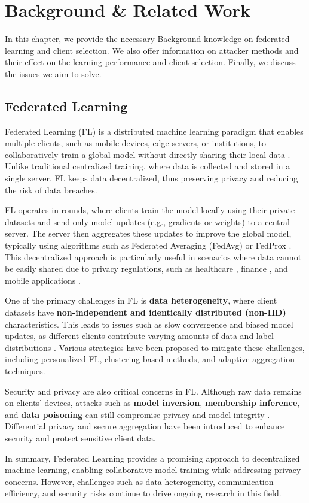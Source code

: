 \chapter{Background \& Related Work}
In this chapter, we provide the necessary Background knowledge on federated learning and client selection. We also offer information on attacker methods and their effect on the learning performance and client selection. Finally, we discuss the issues we aim to solve.

\section{Federated Learning}
Federated Learning (FL) is a distributed machine learning paradigm that enables multiple clients, such as mobile devices, edge servers, or institutions, to collaboratively train a global model without directly sharing their local data \cite{mcmahan2017communication}. Unlike traditional centralized training, where data is collected and stored in a single server, FL keeps data decentralized, thus preserving privacy and reducing the risk of data breaches.

FL operates in rounds, where clients train the model locally using their private datasets and send only model updates (e.g., gradients or weights) to a central server. The server then aggregates these updates to improve the global model, typically using algorithms such as Federated Averaging (FedAvg) \cite{mcmahan2017communication} or FedProx \cite{li2020federated}. This decentralized approach is particularly useful in scenarios where data cannot be easily shared due to privacy regulations, such as healthcare \cite{sheller2020federated}, finance \cite{yang2019federated}, and mobile applications \cite{hard2018federated}.

One of the primary challenges in FL is \textbf{data heterogeneity}, where client datasets have \textbf{non-independent and identically distributed (non-IID)} characteristics. This leads to issues such as slow convergence and biased model updates, as different clients contribute varying amounts of data and label distributions \cite{zhao2018federated}. Various strategies have been proposed to mitigate these challenges, including personalized FL, clustering-based methods, and adaptive aggregation techniques.

Security and privacy are also critical concerns in FL. Although raw data remains on clients' devices, attacks such as \textbf{model inversion}, \textbf{membership inference}, and \textbf{data poisoning} can still compromise privacy and model integrity \cite{nasr2019comprehensive}. Differential privacy \cite{geyer2017differentially} and secure aggregation \cite{bonawitz2017practical} have been introduced to enhance security and protect sensitive client data.

In summary, Federated Learning provides a promising approach to decentralized machine learning, enabling collaborative model training while addressing privacy concerns. However, challenges such as data heterogeneity, communication efficiency, and security risks continue to drive ongoing research in this field.
